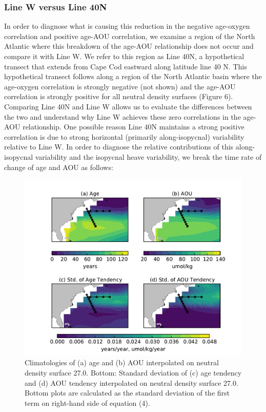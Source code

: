 \subsubsection{Line W versus Line 40N}
In order to diagnose what is causing this reduction in the negative age-oxygen correlation and positive age-AOU correlation, we examine a region of the North Atlantic where this breakdown of the age-AOU relationship does not occur and compare it with Line W. We refer to this region as Line 40N, a hypothetical transect that extends from Cape Cod eastward along latitude line 40 N. This hypothetical transect follows along a region of the North Atlantic basin where the age-oxygen correlation is strongly negative (not shown) and the age-AOU correlation is strongly positive for all neutral density surfaces (Figure 6). Comparing Line 40N and Line W allows us to evaluate the differences between the two and understand why Line W achieves these zero correlations in the age-AOU relationship.
One possible reason Line 40N maintains a strong positive correlation is due to strong horizontal (primarily along-isopycnal) variability relative to Line W. In order to diagnose the relative contributions of this along-isopycnal variability and the isopycnal heave variability, we break the time rate of change of age and AOU as follows:

\begin{figure}
\centering
\includegraphics[width=\linewidth]{spice_figure.pdf}
\caption{Climatologies of (a) age and (b) AOU interpolated on neutral density surface 27.0. Bottom: Standard deviation of (c) age tendency and (d) AOU tendency interpolated on neutral density surface 27.0. Bottom plots are calculated as the standard deviation of the first term on right-hand side of equation (4).}
\label{fig:fig6}
\end{figure}


